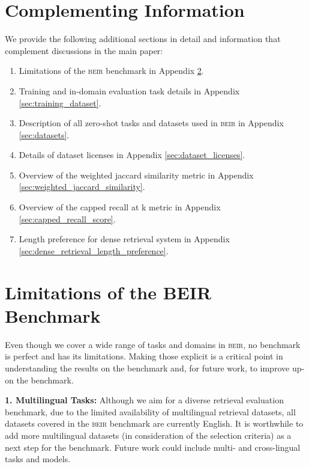 \documentclass{article}
\newcommand{\custo}[1]{\textsc{\normalsize #1}}
\newcommand{\beir}{\custo{beir}\xspace}
\begin{document}
\appendix

\section{Complementing Information}
We provide the following additional sections in detail and information that complement discussions in the main paper: 

\begin{enumerate}
    \item[$\bullet$] Limitations of the \beir benchmark in Appendix \ref{sec:limitations}.
    \item[$\bullet$] Training and in-domain evaluation task details in Appendix \ref{sec:training_dataset}.
    \item[$\bullet$] Description of all zero-shot tasks and datasets used in \beir in Appendix \ref{sec:datasets}.
    \item[$\bullet$] Details of dataset licenses in Appendix \ref{sec:dataset_licenses}.
    \item[$\bullet$] Overview of the weighted jaccard similarity metric in Appendix \ref{sec:weighted_jaccard_similarity}.
    \item[$\bullet$] Overview of the capped recall at k metric in Appendix \ref{sec:capped_recall_score}.
    \item[$\bullet$] Length preference for dense retrieval system in Appendix \ref{sec:dense_retrieval_length_preference}.
\end{enumerate}

\vspace{-2mm}
\section{Limitations of the BEIR Benchmark}\label{sec:limitations}
\vspace{-2mm}

Even though we cover a wide range of tasks and domains in \beir, no benchmark is perfect and has its limitations. Making those explicit is a critical point in understanding the results on the benchmark and, for future work, to improve up-on the benchmark. 

\textbf{1. Multilingual Tasks:} Although we aim for a diverse retrieval evaluation benchmark, due to the limited availability of multilingual retrieval datasets, all datasets covered in the \beir benchmark are currently English. It is worthwhile to add more multilingual datasets \cite{asai-etal-2021-xor, zhang2021mr} (in consideration of the selection criteria) as a next step for the benchmark. Future work could include multi- and cross-lingual tasks and models.
\end{document}
